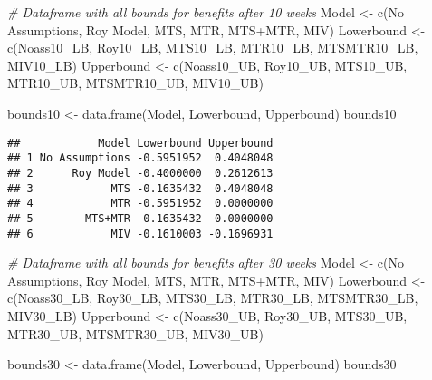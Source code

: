 \documentclass[
]{article}
\newenvironment{Shaded}{\begin{snugshade}}{\end{snugshade}}
\newcommand{\CommentTok}[1]{\textcolor[rgb]{0.56,0.35,0.01}{\textit{#1}}}
\newcommand{\FunctionTok}[1]{\textcolor[rgb]{0.00,0.00,0.00}{#1}}
\newcommand{\NormalTok}[1]{#1}
\newcommand{\OtherTok}[1]{\textcolor[rgb]{0.56,0.35,0.01}{#1}}
\newcommand{\StringTok}[1]{\textcolor[rgb]{0.31,0.60,0.02}{#1}}
\begin{document}
\begin{Shaded}
\begin{Highlighting}[]
\CommentTok{\# Dataframe with all bounds for benefits after 10 weeks}
\NormalTok{Model }\OtherTok{\textless{}{-}} \FunctionTok{c}\NormalTok{(}\StringTok{\textquotesingle{}No Assumptions\textquotesingle{}}\NormalTok{, }\StringTok{\textquotesingle{}Roy Model\textquotesingle{}}\NormalTok{, }\StringTok{\textquotesingle{}MTS\textquotesingle{}}\NormalTok{, }\StringTok{\textquotesingle{}MTR\textquotesingle{}}\NormalTok{, }\StringTok{\textquotesingle{}MTS+MTR\textquotesingle{}}\NormalTok{, }\StringTok{\textquotesingle{}MIV\textquotesingle{}}\NormalTok{)}
\NormalTok{Lowerbound }\OtherTok{\textless{}{-}} \FunctionTok{c}\NormalTok{(Noass10\_LB, Roy10\_LB, MTS10\_LB, MTR10\_LB, MTSMTR10\_LB, MIV10\_LB)}
\NormalTok{Upperbound }\OtherTok{\textless{}{-}} \FunctionTok{c}\NormalTok{(Noass10\_UB, Roy10\_UB, MTS10\_UB, MTR10\_UB, MTSMTR10\_UB, MIV10\_UB)}

\NormalTok{bounds10 }\OtherTok{\textless{}{-}} \FunctionTok{data.frame}\NormalTok{(Model, Lowerbound, Upperbound)}
\NormalTok{bounds10}
\end{Highlighting}
\end{Shaded}

\begin{verbatim}
##            Model Lowerbound Upperbound
## 1 No Assumptions -0.5951952  0.4048048
## 2      Roy Model -0.4000000  0.2612613
## 3            MTS -0.1635432  0.4048048
## 4            MTR -0.5951952  0.0000000
## 5        MTS+MTR -0.1635432  0.0000000
## 6            MIV -0.1610003 -0.1696931
\end{verbatim}

\begin{Shaded}
\begin{Highlighting}[]
\CommentTok{\# Dataframe with all bounds for benefits after 30 weeks}
\NormalTok{Model }\OtherTok{\textless{}{-}} \FunctionTok{c}\NormalTok{(}\StringTok{\textquotesingle{}No Assumptions\textquotesingle{}}\NormalTok{, }\StringTok{\textquotesingle{}Roy Model\textquotesingle{}}\NormalTok{, }\StringTok{\textquotesingle{}MTS\textquotesingle{}}\NormalTok{, }\StringTok{\textquotesingle{}MTR\textquotesingle{}}\NormalTok{, }\StringTok{\textquotesingle{}MTS+MTR\textquotesingle{}}\NormalTok{, }\StringTok{\textquotesingle{}MIV\textquotesingle{}}\NormalTok{)}
\NormalTok{Lowerbound }\OtherTok{\textless{}{-}} \FunctionTok{c}\NormalTok{(Noass30\_LB, Roy30\_LB, MTS30\_LB, MTR30\_LB, MTSMTR30\_LB, MIV30\_LB)}
\NormalTok{Upperbound }\OtherTok{\textless{}{-}} \FunctionTok{c}\NormalTok{(Noass30\_UB, Roy30\_UB, MTS30\_UB, MTR30\_UB, MTSMTR30\_UB, MIV30\_UB)}

\NormalTok{bounds30 }\OtherTok{\textless{}{-}} \FunctionTok{data.frame}\NormalTok{(Model, Lowerbound, Upperbound)}
\NormalTok{bounds30}
\end{Highlighting}
\end{Shaded}
\end{document}
